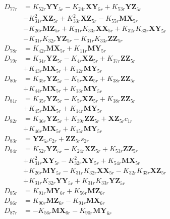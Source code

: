 \begin{multicols}{2}
\begin{align}
D_{77r} &= K_{52r}\mathbf{YY}_{5r} - K_{24r}\mathbf{XY}_{5r} + K_{53r}\mathbf{YZ}_{5r}  \nonumber \\
&- K_{31r}^2\mathbf{XZ}_{5r} + K_{33r}^2\mathbf{XZ}_{5r} - K_{55r}\mathbf{MX}_{5r}  \nonumber \\
&- K_{26r}\mathbf{MZ}_{5r} + K_{31r}K_{33r}\mathbf{XX}_{5r} + K_{32r}K_{33r}\mathbf{XY}_{5r}  \nonumber \\
&- K_{31r}K_{32r}\mathbf{YZ}_{5r} - K_{31r}K_{33r}\mathbf{ZZ}_{5r} \nonumber \\
D_{78r} &= K_{42r}\mathbf{MX}_{5r} + K_{11r}\mathbf{MY}_{5r} \nonumber \\
D_{79r} &= K_{34r}\mathbf{YZ}_{5r} - K_{4r}\mathbf{XZ}_{5r} + K_{37r}\mathbf{ZZ}_{5r}  \nonumber \\
&+ K_{43r}\mathbf{MX}_{5r} + K_{12r}\mathbf{MY}_{5r} \nonumber \\
D_{80r} &= K_{35r}\mathbf{YZ}_{5r} - K_{5r}\mathbf{XZ}_{5r} + K_{38r}\mathbf{ZZ}_{5r}  \nonumber \\
&+ K_{44r}\mathbf{MX}_{5r} + K_{13r}\mathbf{MY}_{5r} \nonumber \\
D_{81r} &= K_{35r}\mathbf{YZ}_{5r} - K_{5r}\mathbf{XZ}_{5r} + K_{38r}\mathbf{ZZ}_{5r}  \nonumber \\
&+ K_{45r}\mathbf{MX}_{5r} + K_{14r}\mathbf{MY}_{5r} \nonumber \\
D_{82r} &= K_{36r}\mathbf{YZ}_{5r} + K_{39r}\mathbf{ZZ}_{5r} + \mathbf{XZ}_{5r}c_{1r}  \nonumber \\
&+ K_{46r}\mathbf{MX}_{5r} + K_{15r}\mathbf{MY}_{5r} \nonumber \\
D_{83r} &= \mathbf{YZ}_{5r}c_{2r} + \mathbf{ZZ}_{5r}s_{2r} \nonumber \\
D_{84r} &= K_{52r}\mathbf{YZ}_{5r} - K_{24r}\mathbf{XZ}_{5r} + K_{53r}\mathbf{ZZ}_{5r}  \nonumber \\
&+ K_{31r}^2\mathbf{XY}_{5r} - K_{32r}^2\mathbf{XY}_{5r} + K_{54r}\mathbf{MX}_{5r}  \nonumber \\
&+ K_{26r}\mathbf{MY}_{5r} - K_{31r}K_{32r}\mathbf{XX}_{5r} - K_{32r}K_{33r}\mathbf{XZ}_{5r}  \nonumber \\
&+ K_{31r}K_{32r}\mathbf{YY}_{5r} + K_{31r}K_{33r}\mathbf{YZ}_{5r} \nonumber \\
D_{85r} &= K_{91r}\mathbf{MY}_{6r} + K_{56r}\mathbf{MZ}_{6r} \nonumber \\
D_{86r} &= K_{90r}\mathbf{MZ}_{6r} - K_{91r}\mathbf{MX}_{6r} \nonumber \\
D_{87r} &= - K_{56r}\mathbf{MX}_{6r} - K_{90r}\mathbf{MY}_{6r} \nonumber \\

\end{align}
\end{multicols}
